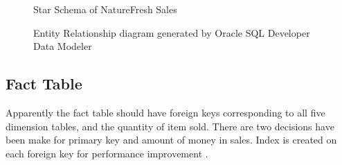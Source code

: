 \documentclass[
  a4paper,
]{article}
\begin{document}
\begin{figure}[htbp]
  \centering
  {
  \fontsize{9}{10}\selectfont
  \def\svgwidth{0.9\columnwidth}
    \resizebox{0.9\textwidth}{!}{}
  }
  \caption{Star Schema of NatureFresh Sales}
  \label{fig:overall}
\end{figure}

\begin{figure}[htbp]
    \centering
    \caption{Entity Relationship diagram generated by Oracle
    SQL Developer Data Modeler\label{fig:data-modeler}}
\end{figure}

\hypertarget{fact-table}{%
\subsection{Fact Table}\label{fact-table}}

Apparently the fact table should have foreign keys corresponding to all
five dimension tables, and the quantity of item sold. There are two
decisions have been make for primary key and amount of money in sales.
Index is created on each foreign key for performance improvement
\autocite{tripp_sqlskills_2017}.
\end{document}
